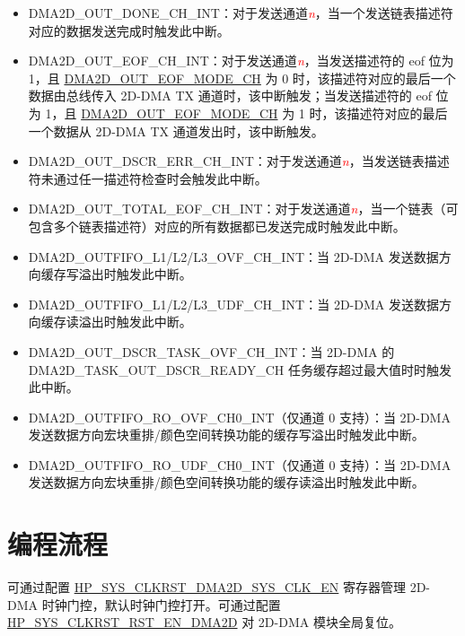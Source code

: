 \documentclass[main\_\_CN.tex]{subfiles}
\begin{document}
\begin{itemize}
    \item \label{int:DMA2DOUTDONEINT}DMA2D\_OUT\_DONE\_CH\_INT：对于发送通道\textcolor{red}{\it{n}}，当一个发送链表描述符对应的数据发送完成时触发此中断。
    \item \label{int:DMA2DOUTEOFINT}DMA2D\_OUT\_EOF\_CH\_INT：对于发送通道\textcolor{red}{\it{n}}，当发送描述符的 eof 位为 1，且 \hyperref[fielddesc:DMA2DOUTEOFMODECHN]{DMA2D\_OUT\_EOF\_MODE\_CH} 为 0 时，该描述符对应的最后一个数据由总线传入 2D-DMA TX 通道时，该中断触发；当发送描述符的 eof 位为 1，且 \hyperref[fielddesc:DMA2DOUTEOFMODECHN]{DMA2D\_OUT\_EOF\_MODE\_CH} 为 1 时，该描述符对应的最后一个数据从 2D-DMA TX 通道发出时，该中断触发。
    \item \label{int:DMA2DOUTDSCRERRINT}DMA2D\_OUT\_DSCR\_ERR\_CH\_INT：对于发送通道\textcolor{red}{\it{n}}，当发送链表描述符未通过任一描述符检查时会触发此中断。
    \item \label{int:DMA2DOUTTOTALEOFINT}DMA2D\_OUT\_TOTAL\_EOF\_CH\_INT：对于发送通道\textcolor{red}{\it{n}}，当一个链表（可包含多个链表描述符）对应的所有数据都已发送完成时触发此中断。
    \item \label{int:DMA2DOUTFIFOOVFINT} DMA2D\_OUTFIFO\_L1/L2/L3\_OVF\_CH\_INT：当 2D-DMA 发送数据方向缓存写溢出时触发此中断。
    \item \label{int:DMA2DOUTFIFOUDFINT} DMA2D\_OUTFIFO\_L1/L2/L3\_UDF\_CH\_INT：当 2D-DMA 发送数据方向缓存读溢出时触发此中断。
    \item \label{int:DMA2DOUTDSCRTASKOVFINT} DMA2D\_OUT\_DSCR\_TASK\_OVF\_CH\_INT：当 2D-DMA 的 DMA2D\_TASK\_OUT\_DSCR\_READY\_CH 任务缓存超过最大值时时触发此中断。
    \item \label{int:DMA2DOUTFIFOROOVFINT} DMA2D\_OUTFIFO\_RO\_OVF\_CH0\_INT（仅通道 0 支持）：当 2D-DMA 发送数据方向宏块重排/颜色空间转换功能的缓存写溢出时触发此中断。
    \item \label{int:DMA2DOUTFIFOROUDFINT} DMA2D\_OUTFIFO\_RO\_UDF\_CH0\_INT（仅通道 0 支持）：当 2D-DMA 发送数据方向宏块重排/颜色空间转换功能的缓存读溢出时触发此中断。
\end{itemize}


\section{编程流程}
\label{sec:2ddma-prog-procedures}

可通过配置 \hyperref[fielddesc:HPSYSCLKRSTDMA2DSYSCLKEN]{HP\_SYS\_CLKRST\_DMA2D\_SYS\_CLK\_EN} 寄存器管理 2D-DMA 时钟门控，默认时钟门控打开。可通过配置 \hyperref[fielddesc:HPSYSCLKRSTRSTENDMA2D]{HP\_SYS\_CLKRST\_RST\_EN\_DMA2D} 对 2D-DMA 模块全局复位。
\end{document}
